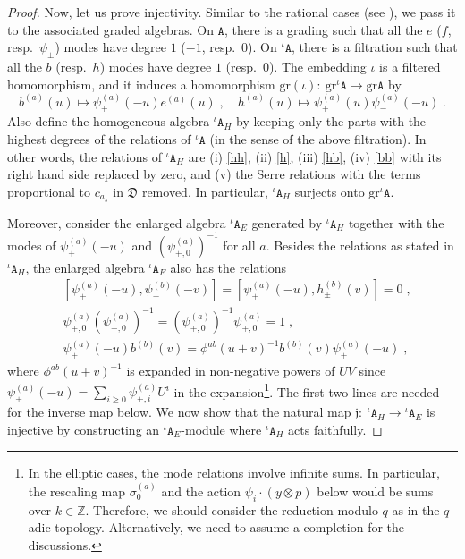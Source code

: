 \documentclass[11pt]{article}
\numberwithin{equation}{section}
\numberwithin{figure}{section}
\numberwithin{table}{section}
\begin{document}
\begin{proof}
	Now, let us prove injectivity. Similar to the rational cases (see \cite[Section 4.3]{Lu_2026}), we pass it to the associated graded algebras. On $\mathtt{A}$, there is a grading such that all the $e$ ($f$, resp.~$\psi_\pm$) modes have degree $1$ ($-1$, resp.~$0$). On ${}^\iota\mathtt{A}$, there is a filtration such that all the $b$ (resp.~$h$) modes have degree $1$ (resp.~$0$). The embedding $\iota$ is a filtered homomorphism, and it induces a homomorphism $\mathrm{gr}(\iota):~\mathrm{gr}{}^\iota\mathtt{A}\rightarrow\mathrm{gr}\mathtt{A}$ by
	\begin{equation}
		b^{(a)}(u)\mapsto\psi_+^{(a)}(-u)e^{(a)}(u)\;,\quad h^{(a)}(u)\mapsto\psi_+^{(a)}(u)\psi_-^{(a)}(-u)\;.
	\end{equation}
	Also define the homogeneous algebra ${}^\iota\mathtt{A}_H$ by keeping only the parts with the highest degrees of the relations of ${}^\iota\mathtt{A}$ (in the sense of the above filtration). In other words, the relations of ${}^\iota\mathtt{A}_H$ are (i) \eqref{hh}, (ii) \eqref{h}, (iii) \eqref{hb}, (iv) \eqref{bb} with its right hand side replaced by zero, and (v) the Serre relations with the terms proportional to $c_{a_s}$ in $\mathfrak{D}$ removed. In particular, ${}^\iota\mathtt{A}_H$ surjects onto $\mathrm{gr}{}^\iota\mathtt{A}$.

	Moreover, consider the enlarged algebra ${}^\iota\mathtt{A}_E$ generated by ${}^\iota\mathtt{A}_H$ together with the modes of $\psi_+^{(a)}(-u)$ and $\left(\psi^{(a)}_{+,0}\right)^{-1}$ for all $a$. Besides the relations as stated in ${}^\iota\mathtt{A}_H$, the enlarged algebra ${}^\iota\mathtt{A}_E$ also has the relations
	\begin{subequations}\label{AErelations}
		\begin{align}
			&\left[\psi^{(a)}_+(-u),\psi^{(b)}_+(-v)\right]=\left[\psi^{(a)}_+(-u),h^{(b)}_\pm(v)\right]=0\;,\\
			&\psi^{(a)}_{+,0}\left(\psi^{(a)}_{+,0}\right)^{-1}=\left(\psi^{(a)}_{+,0}\right)^{-1}\psi^{(a)}_{+,0}=1\;,\\
			&\psi^{(a)}_+(-u)b^{(b)}(v)=\phi^{ab}(u+v)^{-1}b^{(b)}(v)\psi^{(a)}_+(-u)\;,\label{psibE}
		\end{align}
	\end{subequations}
	where $\phi^{ab}(u+v)^{-1}$ is expanded in non-negative powers of $UV$ since $\psi^{(a)}_+(-u)=\sum\limits_{i\geq0}\psi^{(a)}_{+,i}U^i$ in the expansion\footnote{In the elliptic cases, the mode relations involve infinite sums. In particular, the rescaling map $\sigma^{(a)}_0$ and the action $\psi_i\cdot(y\otimes p)$ below would be sums over $k\in\mathbb{Z}$. Therefore, we should consider the reduction modulo $q$ as in the $q$-adic topology. Alternatively, we need to assume a completion for the discussions.}. The first two lines are needed for the inverse map below. We now show that the natural map $\mathfrak{j}:~{}^\iota\mathtt{A}_H\rightarrow{}^\iota\mathtt{A}_E$ is injective by constructing an ${}^\iota\mathtt{A}_E$-module where ${}^\iota\mathtt{A}_H$ acts faithfully.
	

\end{proof}
\end{document}
